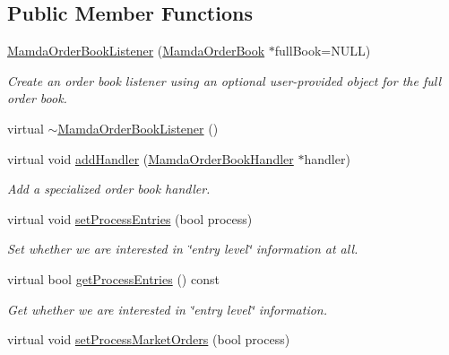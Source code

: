 \subsection*{Public Member Functions}
\begin{CompactItemize}
\item 
\hyperlink{classWombat_1_1MamdaOrderBookListener_bd475cc814e39d0ddfcec003cd46d7f1}{Mamda\-Order\-Book\-Listener} (\hyperlink{classWombat_1_1MamdaOrderBook}{Mamda\-Order\-Book} $\ast$full\-Book=NULL)
\begin{CompactList}\small\item\em Create an order book listener using an optional user-provided object for the full order book. \item\end{CompactList}\item 
virtual \hyperlink{classWombat_1_1MamdaOrderBookListener_519de32ed3343a70f54d313a0a86056b}{$\sim$Mamda\-Order\-Book\-Listener} ()
\item 
virtual void \hyperlink{classWombat_1_1MamdaOrderBookListener_81c34135bae76175b72fed83c3a6325c}{add\-Handler} (\hyperlink{classWombat_1_1MamdaOrderBookHandler}{Mamda\-Order\-Book\-Handler} $\ast$handler)
\begin{CompactList}\small\item\em Add a specialized order book handler. \item\end{CompactList}\item 
virtual void \hyperlink{classWombat_1_1MamdaOrderBookListener_318470f5c5cf4e2873f470610631145f}{set\-Process\-Entries} (bool process)
\begin{CompactList}\small\item\em Set whether we are interested in \char`\"{}entry level\char`\"{} information at all. \item\end{CompactList}\item 
virtual bool \hyperlink{classWombat_1_1MamdaOrderBookListener_4e902b9efbce42035d6e7d455ff64e4e}{get\-Process\-Entries} () const 
\begin{CompactList}\small\item\em Get whether we are interested in \char`\"{}entry level\char`\"{} information. \item\end{CompactList}\item 
virtual void \hyperlink{classWombat_1_1MamdaOrderBookListener_c1c364bb8b843f30464ae5ca275bd3c7}{set\-Process\-Market\-Orders} (bool process)

\end{CompactItemize}
